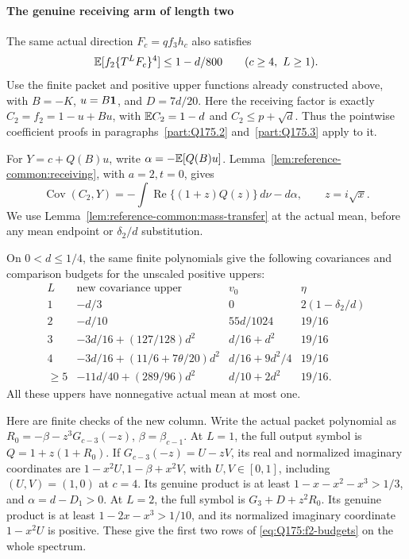 \paragraph{The genuine receiving arm of length two}
\label{part:Q175:f2-extension}
The same actual direction \(F_c=qf_3h_c\) also satisfies
\begin{equation}\label{eq:Q175:f2-extension}
 \mathbb E[f_2\{T^LF_c\}^4]\le1-d/800
 \qquad(c\ge4,\ L\ge1).
\end{equation}
Use the finite packet and positive upper functions already constructed
above, with \(B=-K\), \(u=B\mathbf1\), and \(D=7d/20\).
Here the receiving factor is exactly
\(C_2=f_2=1-u+Bu\), with \(\mathbb E C_2=1-d\) and
\(C_2\le p+\sqrt d\). Thus the pointwise coefficient proofs in
paragraphs~\ref{part:Q175.2} and~\ref{part:Q175.3} apply to it.

For \(Y=c+Q(B)u\), write \(\alpha=-\mathbb E[Q(B)u]\).
Lemma~\ref{lem:reference-common:receiving}, with \(a=2,t=0\), gives
\begin{equation}\label{eq:Q175:f2-covariance}
 \operatorname{Cov}(C_2,Y)
 =-\int\operatorname{Re}\{(1+z)Q(z)\}\,d\nu-d\alpha,
 \qquad z=i\sqrt x.
\end{equation}
We use Lemma~\ref{lem:reference-common:mass-transfer} at the
actual mean, before any mean endpoint or \(\delta_2/d\) substitution.

On \(0<d\le1/4\), the same finite polynomials give the following
covariances and comparison budgets for the unscaled positive uppers:
\begin{equation}\label{eq:Q175:f2-budgets}
\begin{array}{c|c|c|c}
 L&\text{new covariance upper}&v_0&\eta\\\hline
 1&-d/3&0&2(1-\delta_2/d)\\
 2&-d/10&55d/1024&19/16\\
 3&-3d/16+(127/128)d^2&d/16+d^2&19/16\\
 4&-3d/16+(11/6+7\theta/20)d^2&d/16+9d^2/4&19/16\\
 \ge5&-11d/40+(289/96)d^2&d/10+2d^2&19/16.
\end{array}
\end{equation}
All these uppers have nonnegative actual mean at most one.

Here are finite checks of the new column. Write the actual packet
polynomial as \(R_0=-\beta-z^3G_{c-3}(-z)\),
\(\beta=\beta_{c-1}\). At \(L=1\), the full output symbol is
\(Q=1+z(1+R_0)\). If \(G_{c-3}(-z)=U-zV\), its real and
normalized imaginary coordinates are
\(1-x^2U,1-\beta+x^2V\), with \(U,V\in[0,1]\), including
\((U,V)=(1,0)\) at \(c=4\). Its genuine product is at least
\(1-x-x^2-x^3>1/3\), and \(\alpha=d-D_1>0\).
At \(L=2\), the full symbol is \(G_3+D+z^2R_0\). Its genuine
product is at least \(1-2x-x^3>1/10\), and its normalized
imaginary coordinate \(1-x^2U\) is positive. These give the
first two rows of \eqref{eq:Q175:f2-budgets} on the whole spectrum.

